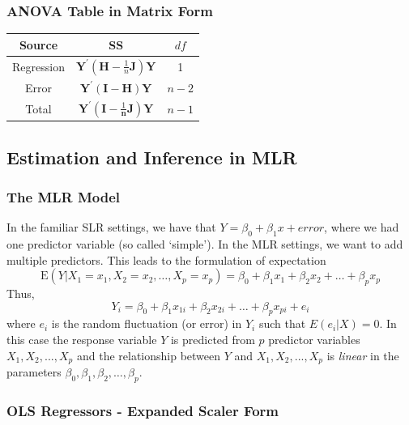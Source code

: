\documentclass[11pt]{article}
\begin{document}
\subsubsection{ANOVA Table in Matrix Form}
\begin{center}
    \begin{tabular}{|c||c|c|}
        \hline
        Source & SS & $df$ \\ \hline
        Regression & $\mathbf{Y}^{\prime}\left(\mathbf{H}-\frac{1}{n} \mathbf{J}\right) \mathbf{Y}$ & 1 \\ \hline
        Error & $\mathbf{Y}^{\prime}(\mathbf{I}-\mathbf{H}) \mathbf{Y}$ & $n-2$ \\ \hline
        Total & $\mathbf{Y}^{\prime}\left(\mathbf{I}-\frac{1}{\mathbf{n}} \mathbf{J}\right) \mathbf{Y}$ & $n-1$ \\ \hline
    \end{tabular}
\end{center}


\subsection{Estimation and Inference in MLR}
\subsubsection{The MLR Model} In the familiar SLR settings, we have that $Y = \beta_0 + \beta_1 x + error$, where we had one predictor variable (so called `simple'). In the MLR settings, we want to add multiple predictors. This leads to the formulation of expectation
\begin{equation*}
    \mathrm{E}\left(Y | X_{1}=x_{1}, X_{2}=x_{2}, \ldots, X_{p}=x_{p}\right)=\beta_{0}+\beta_{1} x_{1}+\beta_{2} x_{2}+\ldots+\beta_{p} x_{p}
\end{equation*}
Thus,
\begin{equation*}
    Y_{i}=\beta_{0}+\beta_{1} x_{1 i}+\beta_{2} x_{2 i}+\ldots+\beta_{p} x_{p i}+e_{i}
\end{equation*}
where $e_i$ is the random fluctuation (or error) in $Y_i$ such that $E(e_i |X) = 0$. In this case the response variable $Y$ is predicted from $p$ predictor variables $X_1,X_2,...,X_p$ and \color{BurntOrange} the relationship between $Y$ and $X_1,X_2,...,X_p$ is \textit{linear} in the parameters $\beta_{0}, \beta_{1}, \beta_{2}, \ldots, \beta_{p}$.  \color{Black}
\subsubsection{OLS Regressors - Expanded Scaler Form}
\end{document}

